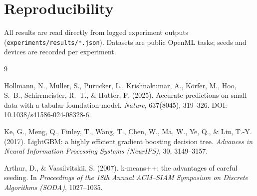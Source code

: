 \documentclass[11pt,a4paper]{article}
\begin{document}
\section*{Reproducibility}

All results are read directly from logged experiment outputs
(\texttt{experiments/results/*.json}). Datasets are public OpenML tasks; seeds
and devices are recorded per experiment.

\begin{thebibliography}{9}

Hollmann, N., Müller, S., Purucker, L., Krishnakumar, A., Körfer, M.,
Hoo, S.~B., Schirrmeister, R.~T., \& Hutter, F. (2025).
Accurate predictions on small data with a tabular foundation model.
\textit{Nature}, 637(8045), 319--326. DOI: 10.1038/s41586-024-08328-6.

Ke, G., Meng, Q., Finley, T., Wang, T., Chen, W., Ma, W., Ye, Q., \& Liu, T.-Y.
(2017). LightGBM: a highly efficient gradient boosting decision tree.
\textit{Advances in Neural Information Processing Systems (NeurIPS)}, 30,
3149--3157.

Arthur, D., \& Vassilvitskii, S. (2007).
k-means++: the advantages of careful seeding.
In \textit{Proceedings of the 18th Annual ACM--SIAM Symposium on Discrete
Algorithms (SODA)}, 1027--1035.

\end{thebibliography}
\end{document}
